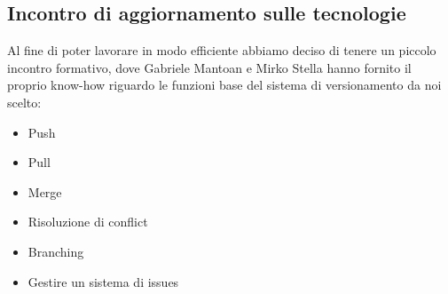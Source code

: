 \subsection{Incontro di aggiornamento sulle tecnologie}
Al fine di poter lavorare in modo efficiente abbiamo deciso di tenere un piccolo incontro formativo, dove Gabriele Mantoan e Mirko Stella hanno fornito il proprio know-how riguardo le funzioni base del sistema di versionamento da noi scelto:
\begin{itemize}
	\item Push
	\item Pull
	\item Merge
	\item Risoluzione di conflict
	\item Branching
	\item Gestire un sistema di issues
\end{itemize}